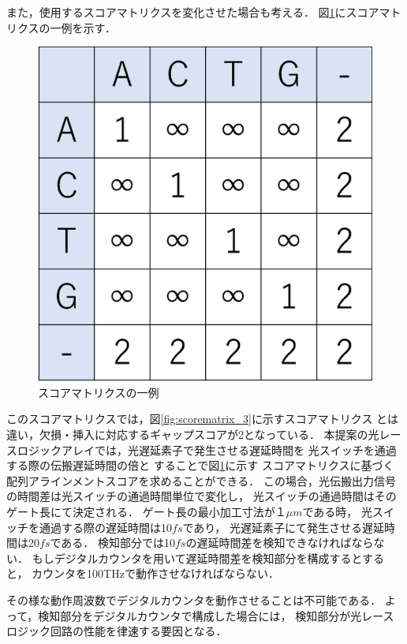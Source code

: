 また，使用するスコアマトリクスを変化させた場合も考える．
図\ref{fig:scorematrix_4}にスコアマトリクスの一例を示す．
\begin{figure}[t!]
\begin{center}
\includegraphics[keepaspectratio,scale=0.4]{fig/5/scorematrix_4.eps}
\caption{スコアマトリクスの一例}
\label{fig:scorematrix_4}
\end{center}
\end{figure}
このスコアマトリクスでは，図\ref{fig:scorematrix_3}に示すスコアマトリクス
とは違い，欠損・挿入に対応するギャップスコアが2となっている．
本提案の光レースロジックアレイでは，光遅延素子で発生させる遅延時間を
光スイッチを通過する際の伝搬遅延時間の倍と
することで図\ref{fig:scorematrix_4}に示す
スコアマトリクスに基づく配列アラインメントスコアを求めることができる．
この場合，光伝搬出力信号の時間差は光スイッチの通過時間単位で変化し，
光スイッチの通過時間はそのゲート長にて決定される．
ゲート長の最小加工寸法が１$\mu m$である時，
光スイッチを通過する際の遅延時間は10$fs$であり，
光遅延素子にて発生させる遅延時間は20$fs$である．
検知部分では10$fs$の遅延時間差を検知できなければならない．
もしデジタルカウンタを用いて遅延時間差を検知部分を構成するとすると，
カウンタを100THzで動作させなければならない．

その様な動作周波数でデジタルカウンタを動作させることは不可能である．
よって，検知部分をデジタルカウンタで構成した場合には，
検知部分が光レースロジック回路の性能を律速する要因となる．

